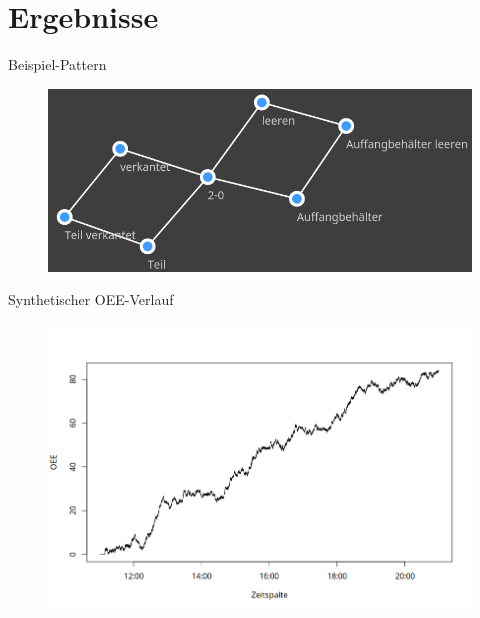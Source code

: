 \documentclass{beamer}
\begin{document}
\section{Ergebnisse}

\begin{frame}{Beispiel-Pattern}
\begin{figure}
    \centering
    \includegraphics[width=1\linewidth]{images/dummy_pattern}
    \label{fig:dumm_pattern}
\end{figure}
\end{frame}

\begin{frame}{Synthetischer OEE-Verlauf}

\begin{figure}
    \centering
    \includegraphics[width=1\linewidth]{images/dummy_random_walk}
    \label{fig:dummyrandomwalk}
\end{figure}
\end{frame}
\end{document}
